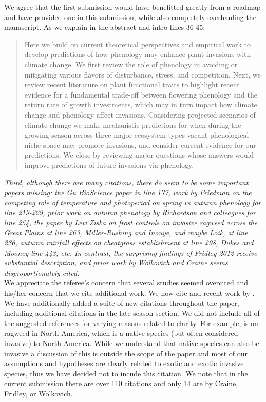 \documentclass[11pt,a4paper]{letter}
\begin{document}
\begin{letter}{}
We agree that the first submission would have benefitted greatly from a roadmap and have provided one in this submission, while also completely overhauling the manuscript. As we explain in the abstract and intro lines 36-45:

\begin{quote}
Here we build on current theoretical perspectives and empirical work to develop predictions of how phenology may enhance plant invasions with climate change. We first review the role of phenology in avoiding or mitigating various flavors of disturbance, stress, and competition. Next, we review recent literature on plant functional traits to highlight recent evidence for a fundamental trade-off between flowering phenology and the return rate of growth investments, which may in turn impact how climate change and phenology affect invasions. Considering projected scenarios of climate change we make mechanistic predictions for when during the growing season across three major ecosystem types vacant phenological niche space may promote invasions, and consider current evidence for our predictions. We close by reviewing major questions whose answers would improve predictions of future invasions via phenology.
\end{quote}

\emph{Third, although there are many citations, there do seem to be some important papers missing: the Gu BioScience paper in line 177, work by Friedman on the competing role of temperature and photoperiod on spring vs autumn phenology for line 219-229, prior work on autumn phenology by Richardson and colleagues for line 254, the paper by Lew Ziska on frost controls on invasive ragweed across the Great Plains at line 263, Miller-Rushing and Inouye, and maybe Loik, at line 286, autumn rainfall effects on cheatgrass establishment at line 298, Dukes and Mooney line 443, etc. In contrast, the surprising findings of Fridley 2012 receive substantial description, and prior work by Wolkovich and Craine seems disproportionately cited.}\\ 

We appreciate the referee's concern that several studies seemed overcited and his/her concern that we cite additional work. We now cite \cite{gu2008} and recent work by \cite{dukes2011}. We have additionally added a suite of new citations throughout the paper, including additional citations in the late season section. We did not include all of the suggested references for varying reasons related to clarity. For example, \cite{ziska2011} is on ragweed in North America, which is a native species (but often considered invasive) to North America. While we understand that native species can also be invasive a discussion of this is outside the scope of the paper and most of our assumptions and hypotheses are clearly related to exotic and exotic invasive species, thus we have decided not to incude this citation. We note that in the current submission there are over 110 citations and only 14 are by Craine, Fridley, or Wolkovich.\\ 


\end{letter}
\end{document}
